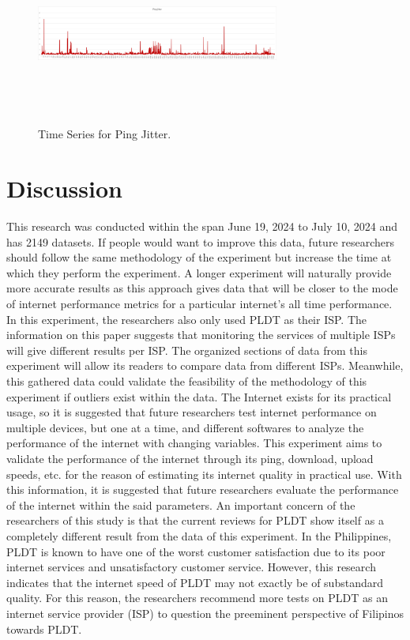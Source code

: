\documentclass[conference]{IEEEtran}
\begin{document}
\begin{figure}[!htbp]
    \centerline{\includegraphics[width=8cm,height=6cm,keepaspectratio]{Figures/Picture8.png}}
    \caption{Time Series for Ping Jitter.}
    \label{fig6}
\end{figure}

\newpage

\section{Discussion}
This research was conducted within the span June 19, 2024 to July 10, 2024 and has 2149 datasets. If people would want to improve this data, future researchers should follow the same methodology of the experiment but increase the time at which they perform the experiment. A longer experiment will naturally provide more accurate results as this approach gives data that will be closer to the mode of internet performance metrics for a particular internet's all time performance. 
In this experiment, the researchers also only used PLDT as their ISP. The information on this paper suggests that monitoring the services of multiple ISPs will give different results per ISP. The organized sections of data from this experiment will allow its readers to compare data from different ISPs. Meanwhile, this gathered data could validate the feasibility of the methodology of this experiment if outliers exist within the data. 
The Internet exists for its practical usage, so it is suggested that future researchers test internet performance on multiple devices, but one at a time, and different softwares to analyze the performance of the internet with changing variables. This experiment aims to validate the performance of the internet through its ping, download, upload speeds, etc. for the reason of estimating its internet quality in practical use. With this information, it is suggested that future researchers evaluate the performance of the internet within the said parameters.
An important concern of the researchers of this study is that the current reviews for PLDT show itself as a completely different result from the data of this experiment. In the Philippines, PLDT is known to have one of the worst customer satisfaction due to its poor internet services and unsatisfactory customer service. However, this research indicates that the internet speed of PLDT may not exactly be of substandard quality. For this reason, the researchers recommend more tests on PLDT as an internet service provider (ISP) to question the preeminent perspective of Filipinos towards PLDT.
\end{document}
